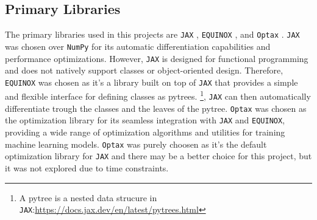 \subsection{Primary Libraries}
The primary libraries used in this projects are \texttt{JAX} \citep{jax2018github}, \texttt{EQUINOX} \citep{kidger2021equinox}, and \texttt{Optax} \citep{optax2020github}. \newline
\texttt{JAX} was chosen over \texttt{NumPy} for its automatic differentiation capabilities and performance optimizations. However, \texttt{JAX} is designed for functional programming and does not natively support classes or object-oriented design.
Therefore, \texttt{EQUINOX} was chosen as it's a library built on top of \texttt{JAX} 
that provides a simple and flexible interface for defining classes as pytrees. \footnote{A pytree is a nested data strucure in \texttt{JAX}:\url{https://docs.jax.dev/en/latest/pytrees.html} }, 
\texttt{JAX} can then automatically differentiate trough the classes and the leaves of the pytree. \newline
\texttt{Optax} was chosen as the optimization library for its seamless integration with \texttt{JAX} and \texttt{EQUINOX}, providing a wide range
of optimization algorithms and utilities for training machine learning models. \texttt{Optax} was purely
choosen as it's the default optimization library for \texttt{JAX} and there may be a better choice for this project, but it was not explored due to time constraints. \newline